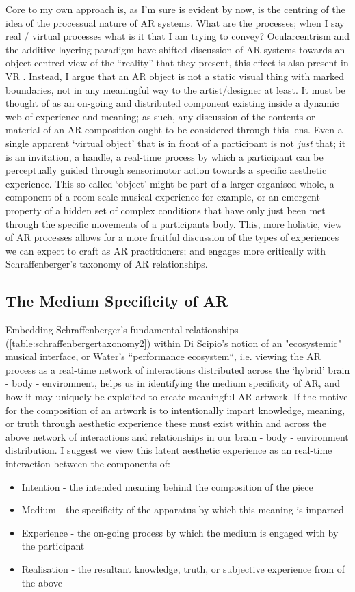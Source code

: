 Core to my own approach is, as I’m sure is evident by now, is the centring of the idea of the processual nature of AR systems. What are the processes; when I say real / virtual processes what is it that I am trying to convey? Ocularcentrism and the additive layering paradigm have shifted discussion of AR systems towards an object-centred view of the “reality” that they present, this effect is also present in VR \citep[]{hovhannisyan2019}. Instead, I argue that an AR object is not a static visual thing with marked boundaries, not in any meaningful way to the artist/designer at least. It must be thought of as an on-going and distributed component existing inside a dynamic web of experience and meaning; as such, any discussion of the contents or material of an AR composition ought to be considered through this lens. Even a single apparent ‘virtual object’ that is in front of a participant is not \textit{just} that; it is an invitation, a handle, a real-time process by which a participant can be perceptually guided through sensorimotor action towards a specific aesthetic experience. This so called ‘object’ might be part of a larger organised whole, a component of a room-scale musical experience for example, or an emergent property of a hidden set of complex conditions that have only just been met through the specific movements of a participants body. This, more holistic, view of AR processes allows for a more fruitful discussion of the types of experiences we can expect to craft as AR practitioners; and engages more critically with Schraffenberger’s taxonomy of AR relationships.

\subsection{The Medium Specificity of AR}\label{sec: theory-materiality-mediumspec}
Embedding Schraffenberger’s fundamental relationships (\autoref{table:schraffenbergertaxonomy2}) within Di Scipio’s notion of an "ecosystemic" musical interface, or Water’s “performance ecosystem“, i.e. viewing the AR process as a real-time network of interactions distributed across the ‘hybrid’ brain - body - environment, helps us in identifying the medium specificity of AR, and how it may uniquely be exploited to create meaningful AR artwork. If the motive for the composition of an artwork is to intentionally impart knowledge, meaning, or truth through aesthetic experience these must exist within and across the above network of interactions and relationships in our brain - body - environment distribution. I suggest we view this latent aesthetic experience as an real-time interaction between the components of:
\begin{itemize}
    \item Intention - the intended meaning behind the composition of the piece
    \item Medium - the specificity of the apparatus by which this meaning is imparted
    \item Experience - the on-going process by which the medium is engaged with by the participant
    \item Realisation - the resultant knowledge, truth, or subjective experience from of the above
\end{itemize}

